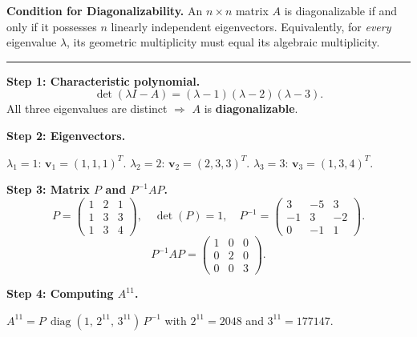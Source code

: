 \documentclass[12pt,a3paper]{article}
\begin{document}
\begin{tcolorbox}[enhanced,breakable,
  colback=cE!4,colframe=cE,boxrule=0.8pt,arc=5pt,
  title={\textbf{Answer --- Condition for Diagonalizability; $P$, $P^{-1}AP$ \& $A^{11}$ for
    $A=\begin{pmatrix}-1&4&-2\\-3&4&0\\-3&1&3\end{pmatrix}$}},
  fonttitle=\bfseries\color{white},colbacktitle=cE]

\textbf{Condition for Diagonalizability.}
An $n\times n$ matrix $A$ is diagonalizable if and only if it possesses $n$
linearly independent eigenvectors. Equivalently, for \emph{every} eigenvalue
$\lambda$, its geometric multiplicity must equal its algebraic multiplicity.

\medskip\textcolor{cE}{\rule{\textwidth}{0.4pt}}

\textbf{Step 1: Characteristic polynomial.}
\[
  \det(\lambda I-A) = (\lambda-1)(\lambda-2)(\lambda-3).
\]
All three eigenvalues are distinct $\Rightarrow$ $A$ is \textbf{diagonalizable}.

\textbf{Step 2: Eigenvectors.}

$\lambda_1=1$: $\mathbf{v}_1=(1,1,1)^T$.\quad
$\lambda_2=2$: $\mathbf{v}_2=(2,3,3)^T$.\quad
$\lambda_3=3$: $\mathbf{v}_3=(1,3,4)^T$.

\textbf{Step 3: Matrix $P$ and $P^{-1}AP$.}
\[
  P=\begin{pmatrix}1&2&1\\1&3&3\\1&3&4\end{pmatrix},\quad
  \det(P)=1,\quad
  P^{-1}=\begin{pmatrix}3&-5&3\\-1&3&-2\\0&-1&1\end{pmatrix}.
\]
\[
  \boxed{P^{-1}AP=\begin{pmatrix}1&0&0\\0&2&0\\0&0&3\end{pmatrix}.}
\]

\textbf{Step 4: Computing $A^{11}$.}

$A^{11}=P\,\operatorname{diag}(1,\,2^{11},\,3^{11})\,P^{-1}$
with $2^{11}=2048$ and $3^{11}=177147$.


\end{tcolorbox}
\end{document}
